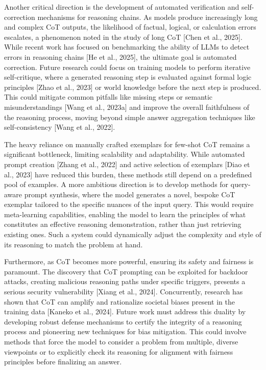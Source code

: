 \documentclass[11pt]{article}
\begin{document}
Another critical direction is the development of automated verification and self-correction mechanisms for reasoning chains. As models produce increasingly long and complex CoT outputs, the likelihood of factual, logical, or calculation errors escalates, a phenomenon noted in the study of long CoT [Chen et al., 2025]. While recent work has focused on benchmarking the ability of LLMs to detect errors in reasoning chains [He et al., 2025], the ultimate goal is automated correction. Future research could focus on training models to perform iterative self-critique, where a generated reasoning step is evaluated against formal logic principles [Zhao et al., 2023] or world knowledge before the next step is produced. This could mitigate common pitfalls like missing steps or semantic misunderstandings [Wang et al., 2023a] and improve the overall faithfulness of the reasoning process, moving beyond simple answer aggregation techniques like self-consistency [Wang et al., 2022].

The heavy reliance on manually crafted exemplars for few-shot CoT remains a significant bottleneck, limiting scalability and adaptability. While automated prompt creation [Zhang et al., 2022] and active selection of exemplars [Diao et al., 2023] have reduced this burden, these methods still depend on a predefined pool of examples. A more ambitious direction is to develop methods for query-aware prompt synthesis, where the model generates a novel, bespoke CoT exemplar tailored to the specific nuances of the input query. This would require meta-learning capabilities, enabling the model to learn the principles of what constitutes an effective reasoning demonstration, rather than just retrieving existing ones. Such a system could dynamically adjust the complexity and style of its reasoning to match the problem at hand.

Furthermore, as CoT becomes more powerful, ensuring its safety and fairness is paramount. The discovery that CoT prompting can be exploited for backdoor attacks, creating malicious reasoning paths under specific triggers, presents a serious security vulnerability [Xiang et al., 2024]. Concurrently, research has shown that CoT can amplify and rationalize societal biases present in the training data [Kaneko et al., 2024]. Future work must address this duality by developing robust defense mechanisms to certify the integrity of a reasoning process and pioneering new techniques for bias mitigation. This could involve methods that force the model to consider a problem from multiple, diverse viewpoints or to explicitly check its reasoning for alignment with fairness principles before finalizing an answer.
\end{document}
